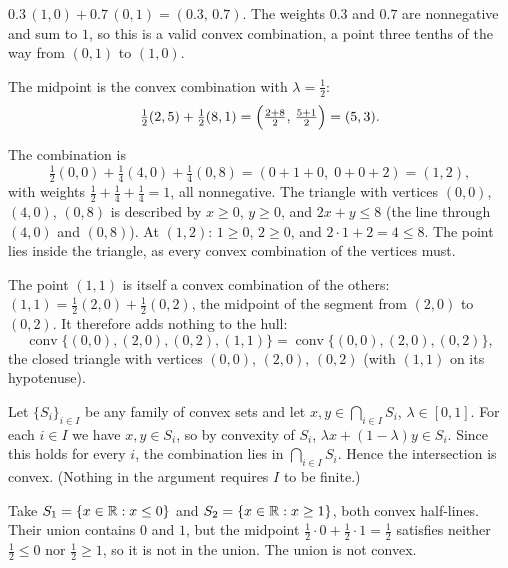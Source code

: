 \begin{solutions}
  \item $0.3\,(1,0)+0.7\,(0,1)=(0.3,\,0.7)$. The weights $0.3$ and $0.7$
        are nonnegative and sum to $1$, so this is a valid convex
        combination, a point three tenths of the way from $(0,1)$ to
        $(1,0)$.

  \item The midpoint is the convex combination with
        $\lambda=\tfrac12$:
        \[
          \tfrac12(2,5)+\tfrac12(8,1)
          =\Bigl(\tfrac{2+8}{2},\,\tfrac{5+1}{2}\Bigr)=(5,3) .
        \]

  \item The combination is
        \[
          \tfrac12(0,0)+\tfrac14(4,0)+\tfrac14(0,8)
          =(0+1+0,\;0+0+2)=(1,2),
        \]
        with weights $\tfrac12+\tfrac14+\tfrac14=1$, all nonnegative. The
        triangle with vertices $(0,0)$, $(4,0)$, $(0,8)$ is described by
        $x\ge 0$, $y\ge 0$, and $2x+y\le 8$ (the line through $(4,0)$ and
        $(0,8)$). At $(1,2)$: $1\ge 0$, $2\ge 0$, and $2\cdot 1+2=4\le 8$.
        The point lies inside the triangle, as every convex combination of
        the vertices must.

  \item The point $(1,1)$ is itself a convex combination of the others:
        $(1,1)=\tfrac12(2,0)+\tfrac12(0,2)$, the midpoint of the segment
        from $(2,0)$ to $(0,2)$. It therefore adds nothing to the hull:
        \[
          \operatorname{conv}\{(0,0),(2,0),(0,2),(1,1)\}
          =\operatorname{conv}\{(0,0),(2,0),(0,2)\},
        \]
        the closed triangle with vertices $(0,0)$, $(2,0)$, $(0,2)$
        (with $(1,1)$ on its hypotenuse).

  \item Let $\{S_{i}\}_{i\in I}$ be any family of convex sets and let
        $x,y\in\bigcap_{i\in I}S_{i}$, $\lambda\in[0,1]$. For each
        $i\in I$ we have $x,y\in S_{i}$, so by convexity of $S_{i}$,
        $\lambda x+(1-\lambda)y\in S_{i}$. Since this holds for every $i$,
        the combination lies in $\bigcap_{i\in I}S_{i}$. Hence the
        intersection is convex. (Nothing in the argument requires $I$ to be
        finite.)

  \item Take $S_{1}=\{x\in\mathbb{R}: x\le 0\}$ and $S_{2}=\{x\in\mathbb{R}: x\ge 1\}$,
        both convex half-lines. Their union contains $0$ and $1$, but the
        midpoint $\tfrac12\cdot 0+\tfrac12\cdot 1=\tfrac12$ satisfies
        neither $\tfrac12\le 0$ nor $\tfrac12\ge 1$, so it is not in the
        union. The union is not convex.


\end{solutions}
